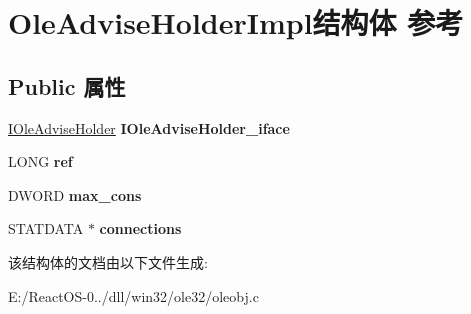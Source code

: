 \hypertarget{struct_ole_advise_holder_impl}{}\section{Ole\+Advise\+Holder\+Impl结构体 参考}
\label{struct_ole_advise_holder_impl}
\subsection*{Public 属性}
\begin{DoxyCompactItemize}
\item 
\mbox{\label{struct_ole_advise_holder_impl_aadf264efe4b694b9c2bc8ddcce69e882}} 
\hyperlink{interface_i_ole_advise_holder}{I\+Ole\+Advise\+Holder} {\bfseries I\+Ole\+Advise\+Holder\+\_\+iface}
\item 
\mbox{\label{struct_ole_advise_holder_impl_a27a512fd1229c2b3a0b561e27e7cade3}} 
L\+O\+NG {\bfseries ref}
\item 
\mbox{\label{struct_ole_advise_holder_impl_af6c93144b49a57037b3286a06ed7ad33}} 
D\+W\+O\+RD {\bfseries max\+\_\+cons}
\item 
\mbox{\label{struct_ole_advise_holder_impl_a8d263a6332799238660aa66230b90f8c}} 
S\+T\+A\+T\+D\+A\+TA $\ast$ {\bfseries connections}
\end{DoxyCompactItemize}


该结构体的文档由以下文件生成\+:\begin{DoxyCompactItemize}
\item 
E\+:/\+React\+O\+S-\/0../dll/win32/ole32/oleobj.\+c\end{DoxyCompactItemize}
